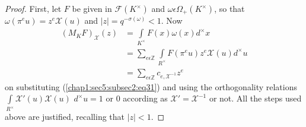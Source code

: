 \begin{proof}
  First, let $F$ be given in $\mathscr{F}(K^\times )$ and
  $\omega\epsilon\Omega_{+}(K^\times )$, so that
  $\omega(\pi^{e}u)=z^{e}\mathcal{X}(u)$ and
  $|z|=q^{-\sigma(\omega)}<1$. Now
  \begin{align*}
    (M_{K}F)_{\mathcal{X}}(z) & =\int\limits_{K^\times}F(x)\omega(x)d^\times x\\
    & =\sum\limits_{e \epsilon\mathbb{Z}}\int\limits_{R^\times
    }F(\pi^{e}u)z^{e}\mathcal{X}(u)d^\times
    u\tag{37} \label{chap1:sec5:subsec3:eq37} \\ 
    & =\sum\limits_{e \epsilon \mathbb{Z}}c_{e,\mathcal{X}^{-1}}
    z^{e}\tag{38}\label{chap1:sec5:subsec3:eq38} 
  \end{align*}
  on substituting (\ref{chap1:sec5:subsec2:eq31}) and using the
  orthogonality relations 
  $\int\limits_{R^\times }\mathcal{X}'(u)\mathcal{X}(u)$ $d^\times u=1$ or
  $0$ according as $\mathcal{X}'=\mathcal{X}^{-1}$ or not. All the steps
  used above are justified, recalling that $|z|<1$. 
\end{proof}

